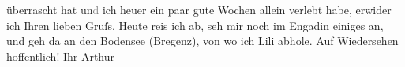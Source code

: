 \begin{ledgroupsized}[t]{13cm}
               überrascht hat un\textcolor{gray}{d} ich \introOben{}heuer\introOben{} ein paar
               gute Wochen allein verlebt habe, {\pb}erwider ich Ihren
               lieben Gruſs. Heute reis ich ab, seh mir noch im Engadin einiges an, und geh da{\geminationn} an den Bodensee (Bregenz), von wo ich Lili abhole. Auf
               Wiedersehen hoffentlich! \pend
           \pstart Ihr \spacefill\mbox{Arthur}\pend{}
         
         \endnumbering{}\end{ledgroupsized}  \newcommand{\dateiname}{L02403}\newcommand{\titel}{Arthur Schnitzler an Hugo Hofmannsthal, 3. 9. 1923}\newcommand{\editorInnen}{Martin Anton Müller und Gerd-Hermann Susen}
      